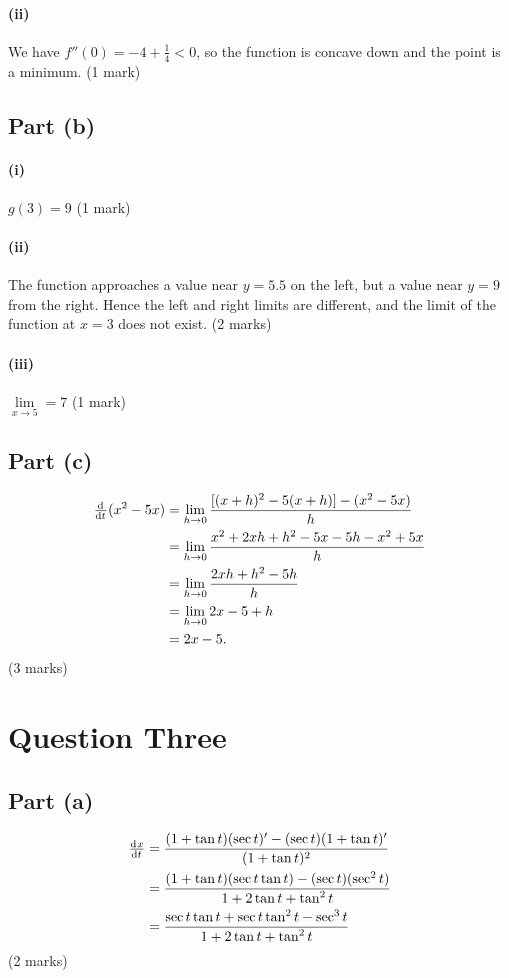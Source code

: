 \documentclass[a4paper]{report}
\begin{document}
\paragraph{(ii)}
We have $ f''(0) = -4 + \frac{1}{4} < 0 $, so the function is concave down and the point is a minimum.
(1 mark)

\subsection*{Part (b)}
\paragraph{(i)}
$ g(3) = 9 $ (1 mark)

\paragraph{(ii)}
The function approaches a value near $ y = 5.5 $ on the left, but a value near $ y = 9 $ from
the right. Hence the left and right limits are different, and the limit of the function at $ x = 3 $
does not exist.
(2 marks)

\paragraph{(iii)}
$ \lim\limits_{x \to 5} = 7 $ (1 mark)

\subsection*{Part (c)}
\begin{align*}
  \od{}{t} (x^2 - 5x) &= \lim_{h \to 0} \frac{[(x + h)^2 -  5(x + h)] - (x^2 - 5x) }{h}\\
                      &= \lim_{h \to 0} \frac{x^2 + 2xh + h^2 - 5x - 5h - x^2 + 5x}{h}\\
                      &= \lim_{h \to 0} \frac{2xh + h^2 - 5h}{h}\\
                      &= \lim_{h \to 0} 2x - 5 + h\\
                      &= 2x - 5.
\end{align*}
(3 marks)

\section*{Question Three}
\subsection*{Part (a)}
\begin{align*}
  \od{x}{t} &= \frac{(1 + \tan t)(\sec t)' - (\sec t)(1 + \tan t)'}{(1 + \tan t)^2}\\
            &= \frac{(1 + \tan t)(\sec t \tan t) - (\sec t)(\sec^2 t)}{1 + 2\tan t + \tan^2 t}\\
            &= \frac{\sec t \tan t + \sec t \tan^2 t - \sec^3 t}{1 + 2\tan t + \tan^2 t}
\end{align*}
(2 marks)
\end{document}
